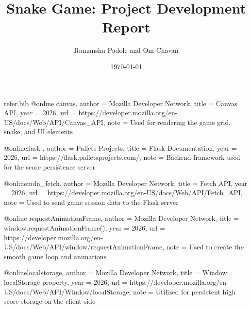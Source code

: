 \begin{filecontents}{refer.bib}
@online{ canvas,
    author = {{Mozilla Developer Network}},
    title = {Canvas API},
    year = {2026},
    url = {https://developer.mozilla.org/en-US/docs/Web/API/Canvas_API},
    note = {Used for rendering the game grid, snake, and UI elements}
}

@online{flask ,
    author = {Pallets Projects},
    title = {Flask Documentation},
    year = {2026},
    url = {https://flask.palletsprojects.com/},
    note = {Backend framework used for the score persistence server}
}

@online{mdn_fetch,
    author = {{Mozilla Developer Network}},
    title = {Fetch API},
    year = {2026},
    url = {https://developer.mozilla.org/en-US/docs/Web/API/Fetch_API},
    note = {Used to send game session data to the Flask server}
}

@online{ requestAnimationFrame,
    author = {{Mozilla Developer Network}},
    title = {window.requestAnimationFrame()},
    year = {2026},
    url = {https://developer.mozilla.org/en-US/docs/Web/API/window/requestAnimationFrame},
    note = {Used to create the smooth game loop and animations}
}

@online{localstorage,
    author = {{Mozilla Developer Network}},
    title = {Window: localStorage property},
    year = {2026},
    url = {https://developer.mozilla.org/en-US/docs/Web/API/Window/localStorage},
    note = {Utilized for persistent high score storage on the client side}
}
\end{filecontents}

\documentclass[11pt]{article}
\usepackage[utf8]{inputenc}
\usepackage[margin=1in]{geometry}
\usepackage{hyperref}
\usepackage{enumitem}
\usepackage{listings}
\usepackage{xcolor}
\usepackage{graphicx}
\usepackage{mdframed}
\usepackage[backend=bibtex]{biblatex}

 
\hypersetup{
    colorlinks=true,
    linkcolor=blue,
    filecolor=magenta,      
    urlcolor=cyan,
}


\title{\textbf{Snake Game: Project Development Report}}
\author{Ramanshu Padole and Om Chavan}
\date{\today}



\maketitle

